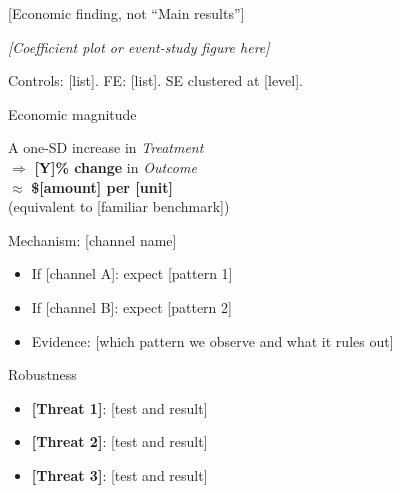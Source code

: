 \documentclass[aspectratio=169,11pt]{beamer}
\begin{document}
\begin{frame}{[Economic finding, not ``Main results'']}
\begin{center}
    \textit{[Coefficient plot or event-study figure here]}
\end{center}
\vspace{-0.5cm}
{\scriptsize Controls: [list]. FE: [list]. SE clustered at [level].}
\end{frame}

\begin{frame}{Economic magnitude}
\begin{center}
\large
A one-SD increase in \textit{Treatment} \\[0.5cm]
$\Rightarrow$ \textbf{[Y]\% change} in \textit{Outcome} \\[0.5cm]
$\approx$ \textbf{\$[amount] per [unit]} \\[0.5cm]
{\normalsize (equivalent to [familiar benchmark])}
\end{center}
\end{frame}

\begin{frame}{Mechanism: [channel name]}
\begin{itemize}
    \item If [channel A]: expect [pattern 1]
    \item If [channel B]: expect [pattern 2]
    \item Evidence: [which pattern we observe and what it rules out]
\end{itemize}
\end{frame}

\begin{frame}{Robustness}
\begin{itemize}
    \item \textbf{[Threat 1]}: [test and result]
    \item \textbf{[Threat 2]}: [test and result]
    \item \textbf{[Threat 3]}: [test and result]
\end{itemize}
\end{frame}
\end{document}
